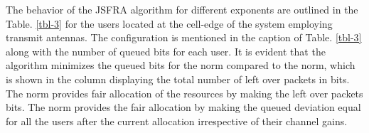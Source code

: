 The behavior of the \ac{JSFRA} algorithm for different exponents  are outlined in the Table. \ref{tbl-3} for the users located at the cell-edge of the system employing  transmit antennas. The configuration is mentioned in the caption of Table. \ref{tbl-3} along with the number of queued bits for each user. It is evident that the algorithm minimizes the queued bits for the  norm compared to the  norm, which is shown in the column displaying the total number of left over packets \me{\chi} in bits. The \me{\ell_{\infty}} norm provides fair allocation of the resources by making the left over packets  bits. The \me{\ell_{\infty}} norm provides the fair allocation by making the queued deviation equal for all the users after the current allocation irrespective of their channel gains.
